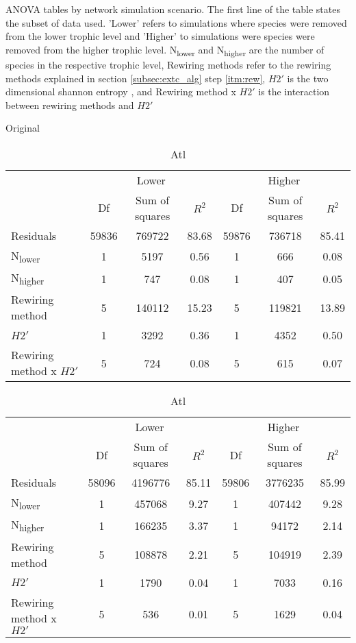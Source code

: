 \documentclass[12pt,a4paper]{article}
\begin{document}
\begin{table}[H]
\label{tab:anova_by_cv}
\caption{ANOVA tables by network simulation scenario. The first line of the table states the subset of data used. 'Lower' refers to simulations where species were removed from the lower trophic level and 'Higher' to simulations were species were removed from the higher trophic level. N\textsubscript{lower} and N\textsubscript{higher} are the number of species in the respective trophic level, Rewiring methods refer to the rewiring methods explained in section \ref{subsec:extc_alg} step \ref{itm:rew}, $H2'$ is the two dimensional shannon entropy \parencite{Bluethgen2006}, and Rewiring method x $H2'$ is the interaction between rewiring methods and $H2'$}
    \begin{subtable}{\linewidth}
    \caption{Original}
    \centering
\begin{tabularx}{\linewidth}{@{} X *6{c} @{}}
\toprule
  & \multicolumn{3}{c}{Lower} & \multicolumn{3}{c}{Higher} \\ \cmidrule(l){2-4} \cmidrule(l){5-7}
  						& Df		& Sum of squares	& $R^2$	& Df 	& Sum of squares	& $R^2$ \\ \midrule
Residuals 				& 59836 & 769722			& 83.68	& 59876 & 736718 		& 85.41   \\
N\textsubscript{lower} 	& 1 		& 5197 			& 0.56 	& 1		& 666 			& 0.08  \\
N\textsubscript{higher} 	& 1 		& 747 			& 0.08	& 1 		& 407 			& 0.05  \\
Rewiring method 			& 5 		& 140112 		& 15.23 	& 5 		& 119821			& 13.89  \\
$H2'$ 					& 1 		& 3292 			& 0.36 	& 1 		& 4352			& 0.50 \\
Rewiring method x $H2'$ 	& 5 		& 724 			& 0.08 	& 5 		& 615			& 0.07  \\ \bottomrule
\end{tabularx}
\end{subtable}

\medskip
\begin{subtable}{\linewidth}
\caption{Atl}
\centering
\begin{tabularx}{\linewidth}{@{} X *6{c} @{}}
\toprule
  & \multicolumn{3}{c}{Lower} & \multicolumn{3}{c}{Higher} \\ \cmidrule(l){2-4} \cmidrule(l){5-7}
  						& Df		& Sum of squares	& $R^2$	& Df 	& Sum of squares	& $R^2$ \\ \midrule
Residuals 				& 58096 & 4196776		& 85.11	& 59806 & 3776235 		& 85.99   \\
N\textsubscript{lower} 	& 1 		& 457068 		& 9.27 	& 1		& 407442		& 9.28  \\
N\textsubscript{higher} 	& 1 		& 166235 			& 3.37	& 1 		& 94172 			& 2.14  \\
Rewiring method 			& 5 		& 108878			& 2.21 	& 5 		& 104919			& 2.39  \\
$H2'$ 					& 1 		& 1790 			& 0.04 	& 1 		& 7033			& 0.16 \\
Rewiring method x $H2'$ 	& 5 		& 536 			& 0.01 	& 5 		& 1629			& 0.04  \\ \bottomrule
\end{tabularx}
\end{subtable}


\end{table}
\end{document}

